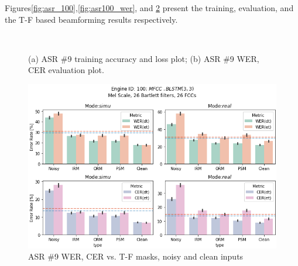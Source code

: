 \bigskip

Figures\;\ref{fig:asr_100},\;\ref{fig:asr100_wer}, and \ref{fig:asr100_wer_masks}
present the training, evaluation, and the 
T-F based beamforming results respectively. 

\begin{figure}[H]
    \centering
    \\
    \vspace{-0.3cm}
    \caption{(a) ASR \#9 training accuracy and loss plot;\;\;
        (b) ASR \#9 WER, CER evaluation plot.}\label{fig:asr100_wer_subplot} 
\end{figure}

\begin{figure}[H]
    \centering
    \includegraphics[width=0.95\linewidth]{ASR/images/asr100_wer_masks.png}
    \caption{ASR \#9 WER, CER vs. T-F masks, noisy and clean inputs }\label{fig:asr100_wer_masks}
\end{figure}


